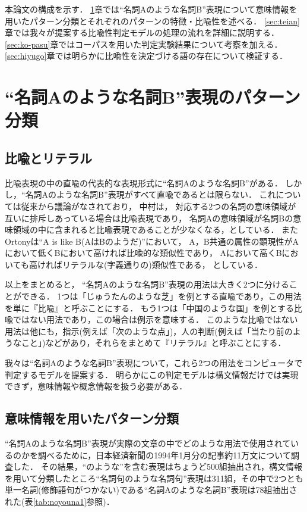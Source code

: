 本論文の構成を示す．
\ref{sec:bunrui}章では``名詞Aのような名詞B''表現について意味情報を用いたパターン分類とそれぞれのパターンの特徴・比喩性を述べる．
\ref{sec:teian}章では我々が提案する比喩性判定モデルの処理の流れを詳細に説明する．
\ref{sec:ko-pasu}章ではコーパスを用いた判定実験結果について考察を加える．
\ref{sec:hiyugo}章では明らかに比喩性を決定づける語の存在について検証する．

\section{``名詞Aのような名詞B''表現のパターン分類}\label{sec:bunrui}

\subsection{比喩とリテラル}\label{subsec:hiyulite}

比喩表現の中の直喩の代表的な表現形式に``名詞Aのような名詞B''がある．
しかし，``名詞Aのような名詞B''表現がすべて直喩であるとは限らない．
これについては従来から議論がなされており，
中村は，
対応する2つの名詞の意味領域が互いに排斥しあっている場合は比喩表現であり，
名詞Aの意味領域が名詞Bの意味領域の中に含まれると比喩表現であることが少なくなる，としている\cite{Nakamura-1}．
またOrtonyは``A is like B(AはBのようだ)''において，
A，B共通の属性の顕現性がAにおいて低くBにおいて高ければ比喩的な類似性であり，
Aにおいて高くBにおいても高ければリテラルな(字義通りの)類似性である，
としている\cite{Ortony-2}．

以上をまとめると，
``名詞Aのような名詞B''表現の用法は大きく2つに分けることができる．
1つは「じゅうたんのような芝」を例とする直喩であり，この用法を単に『比喩』と呼ぶことにする．
もう1つは「中国のような国」を例とする比喩ではない用法であり，この場合は例示を意味する．
このような比喩ではない用法は他にも，指示(例えば「次のような点」)，人の判断(例えば「当たり前のようなこと」)などがあり，それらをまとめて『リテラル』と呼ぶことにする．

我々は``名詞Aのような名詞B''表現について，これら2つの用法をコンピュータで判定するモデルを提案する．
明らかにこの判定モデルは構文情報だけでは実現できず，意味情報や概念情報を扱う必要がある．

\subsection{意味情報を用いたパターン分類}\label{subsec:imitekina}

``名詞Aのような名詞B''表現が実際の文章の中でどのような用法で使用されているのかを調べるために，日本経済新聞\cite{Nikkei-1}の1994年1月分の記事約11万文について調査した．
その結果，``のような''を含む表現はちょうど500組抽出され，構文情報を用いて分類したところ``名詞句のような名詞句''表現は311組，その中で2つとも単一名詞(修飾語句がつかない)である``名詞Aのような名詞B''表現は78組抽出された(表\ref{tab:noyouna1}参照)．

